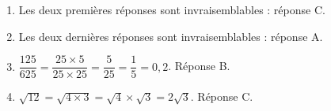 
\medskip
 
%
%
\begin{enumerate}
\item Les deux premières réponses sont invraisemblables : réponse C.
\item Les deux dernières réponses sont invraisemblables : réponse A.
\item $\dfrac{125}{625} = \dfrac{25 \times 5}{25 \times 25} = \dfrac{5}{25} = \dfrac{1}{5} = 0,2$. Réponse B.
\item $\sqrt{12} = \sqrt{4 \times 3} = \sqrt{4} \times \sqrt{3} = 2\sqrt{3}$. Réponse C.
\end{enumerate}

\bigskip

